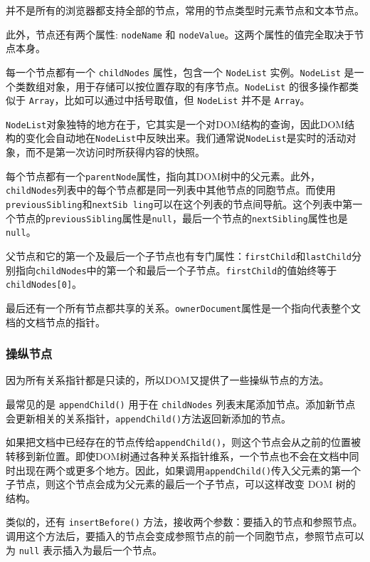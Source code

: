 并不是所有的浏览器都支持全部的节点，常用的节点类型时元素节点和文本节点。

此外，节点还有两个属性: \texttt{nodeName} 和 \texttt{nodeValue}。这两个属性的值完全取决于节点本身。

每一个节点都有一个 \texttt{childNodes} 属性，包含一个 \texttt{NodeList} 实例。\texttt{NodeList}  是一个类数组对象，用于存储可以按位置存取的有序节点。\texttt{NodeList} 的很多操作都类似于 \texttt{Array}，比如可以通过中括号取值，但 \texttt{NodeList} 并不是 \texttt{Array}。

\texttt{NodeList}对象独特的地方在于，它其实是一个对DOM结构的查询，因此DOM结构的变化会自动地在\texttt{NodeList}中反映出来。我们通常说\texttt{NodeList}是实时的活动对象，而不是第一次访问时所获得内容的快照。

每个节点都有一个\texttt{parentNode}属性，指向其DOM树中的父元素。此外，\texttt{childNodes}列表中的每个节点都是同一列表中其他节点的同胞节点。而使用\texttt{previousSibling}和\texttt{nextSib ling}可以在这个列表的节点间导航。这个列表中第一个节点的\texttt{previousSibling}属性是\texttt{null}，最后一个节点的\texttt{nextSibling}属性也是\texttt{null}。

父节点和它的第一个及最后一个子节点也有专门属性：\texttt{firstChild}和\texttt{lastChild}分别指向\texttt{childNodes}中的第一个和最后一个子节点。\texttt{firstChild}的值始终等于\texttt{childNodes[0]}。

最后还有一个所有节点都共享的关系。\texttt{ownerDocument}属性是一个指向代表整个文档的文档节点的指针。

\subsubsection*{操纵节点}

因为所有关系指针都是只读的，所以DOM又提供了一些操纵节点的方法。

最常见的是 \texttt{appendChild()} 用于在 \texttt{childNodes} 列表末尾添加节点。添加新节点会更新相关的关系指针，\texttt{appendChild()}方法返回新添加的节点。

如果把文档中已经存在的节点传给\texttt{appendChild()}，则这个节点会从之前的位置被转移到新位置。即使DOM树通过各种关系指针维系，一个节点也不会在文档中同时出现在两个或更多个地方。因此，如果调用\texttt{appendChild()}传入父元素的第一个子节点，则这个节点会成为父元素的最后一个子节点，可以这样改变 DOM 树的结构。

类似的，还有 \texttt{insertBefore()} 方法，接收两个参数：要插入的节点和参照节点。调用这个方法后，要插入的节点会变成参照节点的前一个同胞节点，参照节点可以为 \texttt{null} 表示插入为最后一个节点。

